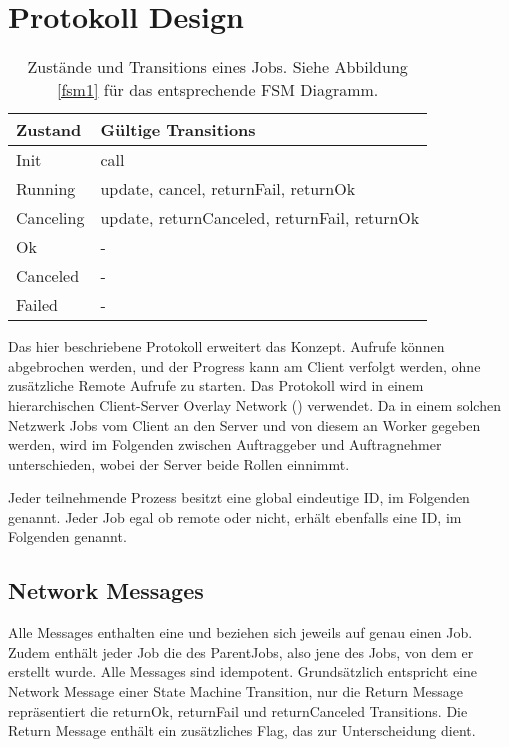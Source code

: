 
\chapter{Protokoll Design}
\label{K4}

\begin{wraptable}{r}{0.55\textwidth}
\vspace{-12pt}
\centering
\begin{tabular}{|l|l|}
\hline
Zustand   & Gültige Transitions                          \\ \hline
Init      & call                                         \\ \hline
Running   & update, cancel, returnFail, returnOk         \\ \hline
Canceling & update, returnCanceled, returnFail, returnOk \\ \hline
Ok        & -                                            \\ \hline
Canceled  & -                                            \\ \hline
Failed    & -                                            \\ \hline
\end{tabular}
\caption{Zustände und Transitions eines Jobs. Siehe Abbildung \ref{fsm1} für das entsprechende FSM Diagramm.}
\label{my-label}
\end{wraptable}

Das hier beschriebene Protokoll erweitert das \rpc{} Konzept.
Aufrufe können abgebrochen werden, und der Progress kann am Client verfolgt werden, ohne zusätzliche Remote Aufrufe zu starten.
Das Protokoll wird in einem hierarchischen Client-Server Overlay Network (\hcsno{}) verwendet.
Da in einem solchen Netzwerk Jobs vom Client an den Server und von diesem an Worker gegeben werden, wird im Folgenden zwischen Auftraggeber und Auftragnehmer unterschieden, wobei der Server beide Rollen einnimmt.

Jeder teilnehmende Prozess besitzt eine global eindeutige ID, im Folgenden \NodeID{} genannt. Jeder Job egal ob remote oder nicht, erhält ebenfalls eine ID, im Folgenden \JobID{} genannt.


\section{Network Messages}
\label{messages}
Alle Messages enthalten eine \JobID{} und beziehen sich jeweils auf genau einen Job.
Zudem enthält jeder Job die \JobID{} des ParentJobs, also jene des Jobs, von dem er erstellt wurde.
Alle Messages sind idempotent. Grundsätzlich entspricht eine Network Message einer State Machine Transition, nur die Return Message repräsentiert die returnOk, returnFail und returnCanceled Transitions.
Die Return Message enthält ein zusätzliches Flag, das zur Unterscheidung dient.

